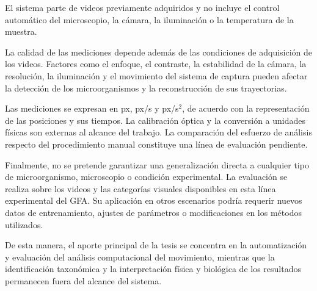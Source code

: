 El sistema parte de videos previamente adquiridos y no incluye el control automático del microscopio, la cámara, la iluminación o la temperatura de la muestra.

La calidad de las mediciones depende además de las condiciones de adquisición de los videos. Factores como el enfoque, el contraste, la estabilidad de la cámara, la resolución, la iluminación y el movimiento del sistema de captura pueden afectar la detección de los microorganismos y la reconstrucción de sus trayectorias.

Las mediciones se expresan en px, px/s y px/s$^2$, de acuerdo con la representación de las posiciones y sus tiempos. La calibración óptica y la conversión a unidades físicas son externas al alcance del trabajo. La comparación del esfuerzo de análisis respecto del procedimiento manual constituye una línea de evaluación pendiente.

Finalmente, no se pretende garantizar una generalización directa a cualquier tipo de microorganismo, microscopio o condición experimental. La evaluación se realiza sobre los videos y las categorías visuales disponibles en esta línea experimental del GFA. Su aplicación en otros escenarios podría requerir nuevos datos de entrenamiento, ajustes de parámetros o modificaciones en los métodos utilizados.

De esta manera, el aporte principal de la tesis se concentra en la automatización y evaluación del análisis computacional del movimiento, mientras que la identificación taxonómica y la interpretación física y biológica de los resultados permanecen fuera del alcance del sistema.
